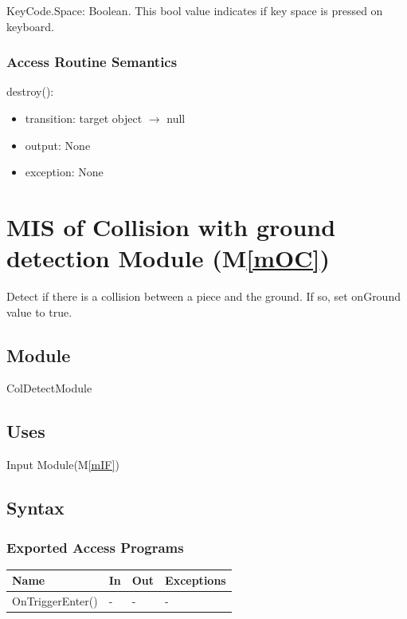 \documentclass[12pt, titlepage]{article}
\newcommand{\mref}[1]{M\ref{#1}}
\begin{document}
KeyCode.Space: Boolean.
This bool value indicates if key space is pressed on keyboard.

\subsubsection{Access Routine Semantics}

\noindent destroy():\\
\begin{itemize}
	\item transition: target object $\rightarrow$ null
	\item output: None
	\item exception: None
\end{itemize}


\section{MIS of Collision with ground detection Module (\mref{mOC})}

Detect if there is a collision between a piece and the ground. If so, set onGround
value to true.

\subsection{Module}

ColDetectModule

\subsection{Uses}

Input Module(\mref{mIF})

\subsection{Syntax}

\subsubsection{Exported Access Programs}

\begin{center}
	\begin{tabular}{p{4cm} p{4cm} p{4cm} p{2cm}}
		\hline
		\textbf{Name} & \textbf{In} & \textbf{Out} & \textbf{Exceptions} \\
		\hline
		OnTriggerEnter() & - & - & - \\
		\hline
	\end{tabular}
\end{center}
\end{document}
